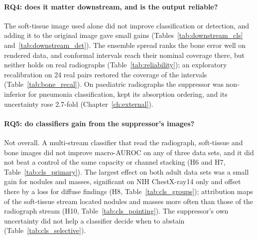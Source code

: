 \paragraph{RQ4: does it matter downstream, and is the output reliable?} The soft-tissue image used alone did not improve classification or
detection, and adding it to the original image gave small gains (Tables~\ref{tab:downstream_cls} and~\ref{tab:downstream_det}). The
ensemble spread ranks the bone error well on rendered data, and conformal intervals reach their nominal coverage there, but neither holds on
real radiographs (Table~\ref{tab:reliability}); an exploratory recalibration on 24 real pairs restored the coverage of the intervals
(Table~\ref{tab:bone_recal}). On paediatric radiographs the suppressor was non-inferior for pneumonia classification, kept its absorption
ordering, and its uncertainty rose 2.7-fold (Chapter~\ref{ch:external}).

\paragraph{RQ5: do classifiers gain from the suppressor's images?} Not overall. A multi-stream classifier that read the radiograph,
soft-tissue and bone images did not improve macro-AUROC on any of three data sets, and it did not beat a control of the same capacity or
channel stacking (H6 and H7, Table~\ref{tab:cls_primary}). The largest effect on both adult data sets was a small gain for nodules and
masses, significant on NIH ChestX-ray14 only and offset there by a loss for diffuse findings (H8, Table~\ref{tab:cls_groups}); attribution
maps of the soft-tissue stream located nodules and masses more often than those of the radiograph stream (H10,
Table~\ref{tab:cls_pointing}). The suppressor's own uncertainty did not help a classifier decide when to abstain
(Table~\ref{tab:cls_selective}).

